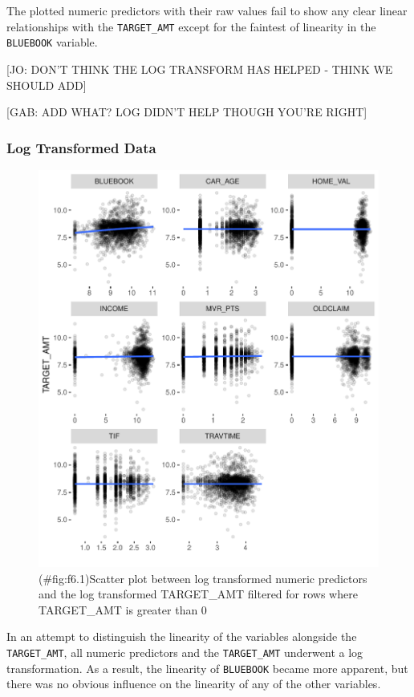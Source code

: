 \documentclass[]{article}
\begin{document}
The plotted numeric predictors with their raw values fail to show any
clear linear relationships with the \texttt{TARGET\_AMT} except for the
faintest of linearity in the \texttt{BLUEBOOK} variable.

{[}JO: DON'T THINK THE LOG TRANSFORM HAS HELPED - THINK WE SHOULD ADD{]}

{[}GAB: ADD WHAT? LOG DIDN'T HELP THOUGH YOU'RE RIGHT{]}

\subsubsection{Log Transformed Data}\label{log-transformed-data}

\begin{figure}
\centering
\includegraphics{proj4_files/figure-latex/f6.1-1.pdf}
\caption{(\#fig:f6.1)Scatter plot between log transformed numeric
predictors and the log transformed TARGET\_AMT filtered for rows where
TARGET\_AMT is greater than 0}
\end{figure}

In an attempt to distinguish the linearity of the variables alongside
the \texttt{TARGET\_AMT}, all numeric predictors and the
\texttt{TARGET\_AMT} underwent a log transformation. As a result, the
linearity of \texttt{BLUEBOOK} became more apparent, but there was no
obvious influence on the linearity of any of the other variables.
\end{document}
